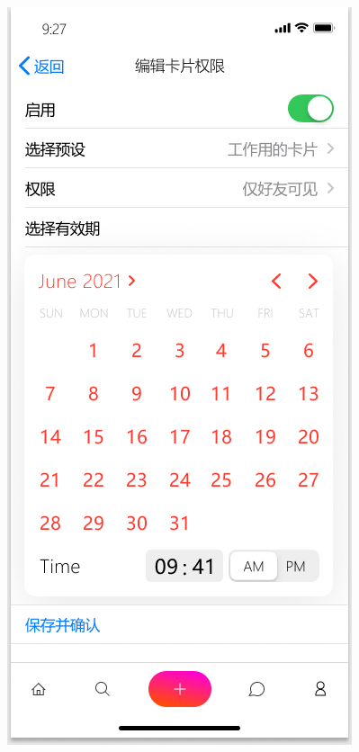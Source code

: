 \documentclass[UTF8]{ctexart}
\begin{document}
\begin{figure}[htbp]
{\begin{minipage}[b]{.3\linewidth}
            \includegraphics[scale=0.3]{NFCCardManage.png}
        \end{minipage}
    }
\end{figure}
\end{document}
